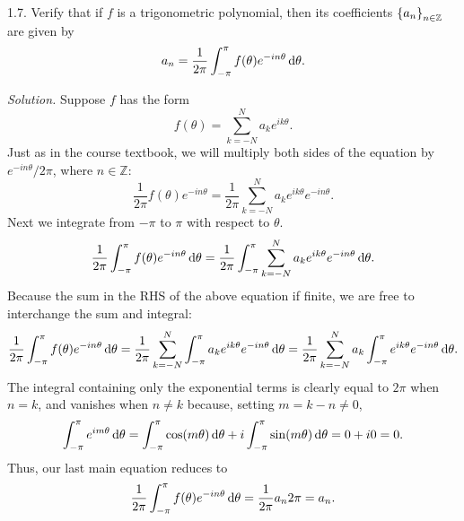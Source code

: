 \documentclass{article}
\newcommand{\Z}{\mathbb{Z}}
\begin{document}
\newpage

1.7. Verify that if $f$ is a trigonometric polynomial, then its
coefficients $\cbr{a_n}_{n \in \Z}$ are given by
%
\begin{equation*}
    a_n = \frac{1}{2 \pi} \int_{-\pi}^\pi f(\theta) e^{-i n \theta} \dif \theta
    .
\end{equation*}

\textit{Solution.} Suppose $f$ has the form
%
\begin{equation*}
    f(\theta) = \sum_{k = -N}^N a_k e^{i k \theta}
    .
\end{equation*}
%
Just as in the course textbook, we will multiply both sides of the
equation by $e^{-i n \theta}/2 \pi$, where $n \in \Z$:
%
\begin{equation*}
    \frac{1}{2 \pi} f(\theta) e^{- i n \theta} = \frac{1}{2 \pi} \sum_{k = -N}^N a_k e^{i k \theta} e^{-i n \theta}
    .
\end{equation*}
%
Next we integrate from $- \pi$ to $\pi$ with respect to $\theta$.
%
\begin{equation*}
    \frac{1}{2 \pi} \int_{- \pi}^\pi f(\theta) e^{- i n \theta} \dif \theta
    = \frac{1}{2 \pi} \int_{- \pi}^\pi \sum_{k = -N}^N a_k e^{i k \theta} e^{-i n \theta} \dif \theta
    .
\end{equation*}
%
Because the sum in the RHS of the above equation if finite, we are free
to interchange the sum and integral:
%
\begin{equation*}
    \frac{1}{2 \pi} \int_{- \pi}^\pi f(\theta) e^{- i n \theta} \dif \theta
    = \frac{1}{2 \pi} \sum_{k = -N}^N \int_{- \pi}^\pi  a_k e^{i k \theta} e^{-i n \theta} \dif \theta
    = \frac{1}{2 \pi} \sum_{k = -N}^N a_k \int_{- \pi}^\pi  e^{i k \theta} e^{-i n \theta} \dif \theta
    .
\end{equation*}
%
The integral containing only the exponential terms is clearly equal to
$2 \pi$ when $n = k$, and vanishes when $n \neq k$ because, setting $m = k - n \neq 0$,
%
\begin{equation*}
    \int_{- \pi}^{\pi} e^{i m \theta} \dif \theta
    =
    \int_{- \pi}^{\pi} \cos(m \theta) \dif \theta
    +
    i \int_{- \pi}^{\pi} \sin(m \theta) \dif \theta
    = 0 + i 0 = 0
    .
\end{equation*}
%
Thus, our last main equation reduces to
%
\begin{equation*}
    \frac{1}{2 \pi} \int_{- \pi}^\pi f(\theta) e^{- i n \theta} \dif \theta
    = \frac{1}{2 \pi} a_n 2 \pi
    = a_n
    .
\end{equation*}
\end{document}
